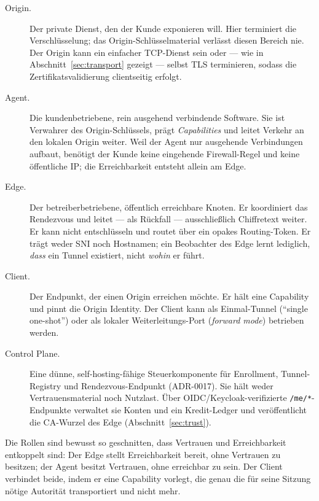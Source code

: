 \begin{description}
  \item[Origin.] Der private Dienst, den der Kunde exponieren will. Hier
    terminiert die Verschlüsselung; das Origin-Schlüsselmaterial verlässt diesen
    Bereich nie. Der Origin kann ein einfacher TCP-Dienst sein oder --- wie in
    Abschnitt~\ref{sec:transport} gezeigt --- selbst TLS terminieren, sodass die
    Zertifikatsvalidierung clientseitig erfolgt.
  \item[Agent.] Die kundenbetriebene, rein ausgehend verbindende Software. Sie
    ist Verwahrer des Origin-Schlüssels, prägt \emph{Capabilities} und leitet
    Verkehr an den lokalen Origin weiter. Weil der Agent nur ausgehende
    Verbindungen aufbaut, benötigt der Kunde keine eingehende Firewall-Regel und
    keine öffentliche IP; die Erreichbarkeit entsteht allein am Edge.
  \item[Edge.] Der betreiberbetriebene, öffentlich erreichbare Knoten. Er
    koordiniert das Rendezvous und leitet --- als Rückfall --- ausschließlich
    Chiffretext weiter. Er kann nicht entschlüsseln und routet über ein opakes
    Routing-Token. Er trägt weder SNI noch Hostnamen; ein Beobachter des Edge
    lernt lediglich, \emph{dass} ein Tunnel existiert, nicht \emph{wohin} er
    führt.
  \item[Client.] Der Endpunkt, der einen Origin erreichen möchte. Er hält eine
    Capability und pinnt die Origin Identity. Der Client kann als
    Einmal-Tunnel (\enquote{single one-shot}) oder als lokaler
    Weiterleitungs-Port (\emph{forward mode}) betrieben werden.
  \item[Control Plane.] Eine dünne, self-hosting-fähige Steuerkomponente für
    Enrollment, Tunnel-Registry und Rendezvous-Endpunkt (ADR-0017). Sie hält
    weder Vertrauensmaterial noch Nutzlast. Über OIDC/Keycloak-verifizierte
    \texttt{/me/*}-Endpunkte verwaltet sie Konten und ein Kredit-Ledger und
    veröffentlicht die CA-Wurzel des Edge (Abschnitt~\ref{sec:trust}).
\end{description}

Die Rollen sind bewusst so geschnitten, dass Vertrauen und Erreichbarkeit
entkoppelt sind: Der Edge stellt Erreichbarkeit bereit, ohne Vertrauen zu
besitzen; der Agent besitzt Vertrauen, ohne erreichbar zu sein. Der Client
verbindet beide, indem er eine Capability vorlegt, die genau die für seine
Sitzung nötige Autorität transportiert und nicht mehr.

